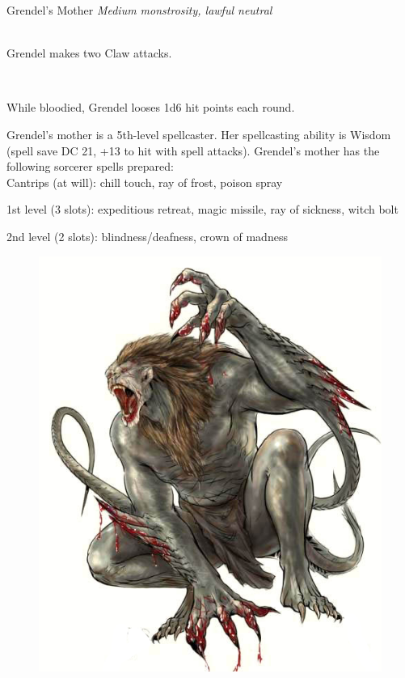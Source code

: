 \documentclass[10pt,twoside,twocolumn,openany]{book}
\begin{document}
\begin{monsterbox}{Grendel's Mother}
	\textit{Medium monstrosity, lawful neutral}\\
	\hline
	\basics[%
	armorclass = 15,
	hitpoints  = 90,
	speed      = 40 ft
	]
	\hline
	\stats[
    STR = \stat{14},
    DEX = \stat{16},
    CON = \stat{14},
    INT = \stat{19},
    WIS = \stat{22},
    CHA = \stat{7}
	]
	\hline
	\details[%
	senses = {darkvision 60ft., passive Perception 16},
	languages = {Common, Abyssal},
	challenge = 7
	]
	\hline \\[1mm]
	\begin{monsteraction}[Multiattack]
		Grendel makes two Claw attacks.
	\end{monsteraction}\\
	\begin{monsteraction}[It Bleeds]
		While bloodied, Grendel looses 1d6 hit points each round.
	\end{monsteraction}
	
	\begin{monsteraction}[Spellcasting]
		Grendel's mother is a 5th-level spellcaster. Her spellcasting ability is Wisdom (spell save DC 21, +13 to hit with spell attacks). Grendel's mother has the following sorcerer spells prepared:\\
		
		Cantrips (at will): chill touch, ray of frost, poison spray
		
		1st level (3 slots): expeditious retreat, magic missile, ray of sickness, witch bolt
		
		2nd level (2 slots): blindness/deafness, crown of madness
	\end{monsteraction}
\end{monsterbox}

\begin{figure}

	\vspace{-4.5cm}
	
	\centerline{
		\includegraphics[scale=1]{grendel}
	}
\end{figure}
\end{document}
